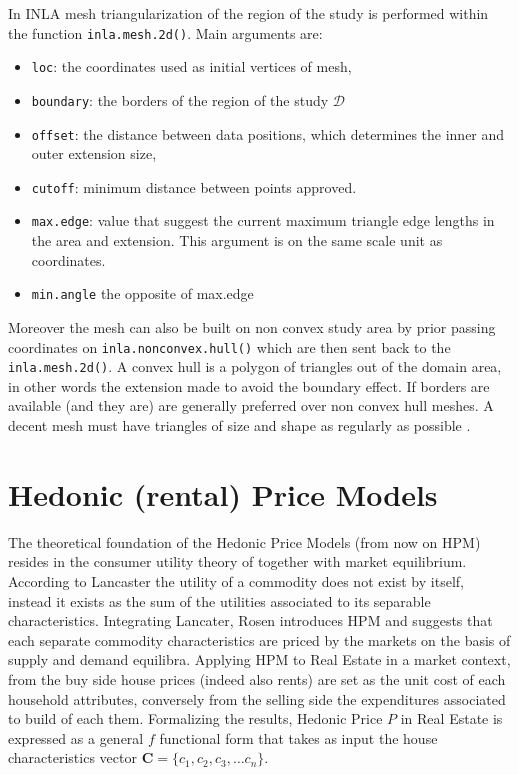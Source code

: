 \documentclass[
  12pt,
  a4paper,
  oneside]{book}
\newcommand{\passthrough}[1]{#1}
\providecommand{\tightlist}{%
  \setlength{\itemsep}{0pt}\setlength{\parskip}{0pt}}
\theoremstyle{definition}
\theoremstyle{definition}
\theoremstyle{definition}
\theoremstyle{remark}
\begin{document}
In INLA mesh triangularization of the region of the study is performed within the function \passthrough{\lstinline!inla.mesh.2d()!}. Main arguments are:

\begin{itemize}
\tightlist
\item
  \passthrough{\lstinline!loc!}: the coordinates used as initial vertices of mesh,
\item
  \passthrough{\lstinline!boundary!}: the borders of the region of the study \(\mathscr{D}\)
\item
  \passthrough{\lstinline!offset!}: the distance between data positions, which determines the inner and outer extension size,
\item
  \passthrough{\lstinline!cutoff!}: minimum distance between points approved.
\item
  \passthrough{\lstinline!max.edge!}: value that suggest the current maximum triangle edge lengths in the area and extension. This argument is on the same scale unit as coordinates.
\item
  \passthrough{\lstinline!min.angle!} the opposite of max.edge
\end{itemize}

Moreover the mesh can also be built on non convex study area by prior passing coordinates on \passthrough{\lstinline!inla.nonconvex.hull()!} which are then sent back to the \passthrough{\lstinline!inla.mesh.2d()!}. A convex hull is a polygon of triangles out of the domain area, in other words the extension made to avoid the boundary effect. If borders are available (and they are) are generally preferred over non convex hull meshes. A decent mesh must have triangles of size and shape as regularly as possible \citep{Krainski-Rubio}.

\hypertarget{hedonic-rental-price-models}{%
\section{Hedonic (rental) Price Models}\label{hedonic-rental-price-models}}

The theoretical foundation of the Hedonic Price Models (from now on HPM) resides in the consumer utility theory of \citet{Lancaster} together with \citet{Rosen} market equilibrium. According to Lancaster the utility of a commodity does not exist by itself, instead it exists as the sum of the utilities associated to its separable characteristics. Integrating Lancater, Rosen introduces HPM and suggests that each separate commodity characteristics are priced by the markets on the basis of supply and demand equilibra. Applying HPM to Real Estate in a market context, from the buy side house prices (indeed also rents) are set as the unit cost of each household attributes, conversely from the selling side the expenditures associated to build of each them. Formalizing the results, Hedonic Price \(P\) in Real Estate is expressed as a general \(f\) functional form that takes as input the house characteristics vector \(\mathbf{C} = \{c_1,c_2, c_3, \ldots c_n\}\).
\end{document}
